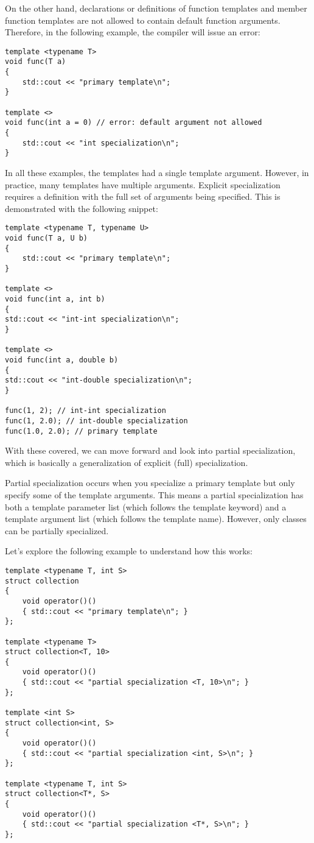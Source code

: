 On the other hand, declarations or definitions of function templates and member function templates are not allowed to contain default function arguments. Therefore, in the following example, the compiler will issue an error:

\begin{lstlisting}[style=styleCXX]
template <typename T>
void func(T a)
{
	std::cout << "primary template\n";
}

template <>
void func(int a = 0) // error: default argument not allowed
{
	std::cout << "int specialization\n";
}
\end{lstlisting}

In all these examples, the templates had a single template argument. However, in practice, many templates have multiple arguments. Explicit specialization requires a definition with the full set of arguments being specified. This is demonstrated with the following snippet:

\begin{lstlisting}[style=styleCXX]
template <typename T, typename U>
void func(T a, U b)
{
	std::cout << "primary template\n";
}

template <>
void func(int a, int b)
{
std::cout << "int-int specialization\n";
}

template <>
void func(int a, double b)
{
std::cout << "int-double specialization\n";
}

func(1, 2); // int-int specialization
func(1, 2.0); // int-double specialization
func(1.0, 2.0); // primary template
\end{lstlisting}

With these covered, we can move forward and look into partial specialization, which is basically a generalization of explicit (full) specialization.


Partial specialization occurs when you specialize a primary template but only specify some of the template arguments. This means a partial specialization has both a template parameter list (which follows the template keyword) and a template argument list (which follows the template name). However, only classes can be partially specialized.

Let's explore the following example to understand how this works:

\begin{lstlisting}[style=styleCXX]
template <typename T, int S>
struct collection
{
	void operator()()
	{ std::cout << "primary template\n"; }
};

template <typename T>
struct collection<T, 10>
{
	void operator()()
	{ std::cout << "partial specialization <T, 10>\n"; }
};

template <int S>
struct collection<int, S>
{
	void operator()()
	{ std::cout << "partial specialization <int, S>\n"; }
};

template <typename T, int S>
struct collection<T*, S>
{
	void operator()()
	{ std::cout << "partial specialization <T*, S>\n"; }
};
\end{lstlisting}

